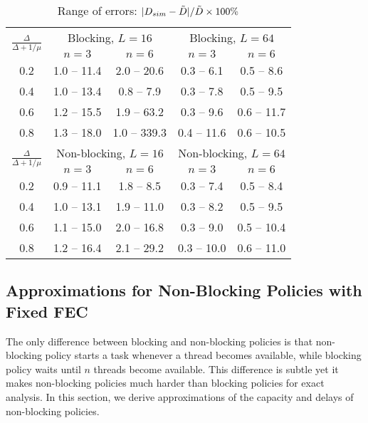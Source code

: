 \documentclass[journal]{IEEEtran}
\begin{document}
\begin{table}[t]
\centering
\begin{tabular}{|c|c|c|c|c|}
\hline
\multirow{2}{*}{$\frac{\Delta}{\Delta + 1/\mu}$} & \multicolumn{2}{c|}{ Blocking, $L = 16$}  & \multicolumn{2}{c|}{ Blocking, $L = 64$}\\
\cline{2-5}
& $n=3$ & $n=6$ & $n=3$  & $n=6$\\
\hline
0.2& 1.0 -- 11.4 & 2.0 -- 20.6 & 0.3 -- 6.1 & 0.5 -- 8.6\\
\hline
0.4& 1.0 -- 13.4 & 0.8 -- 7.9 & 0.3 -- 7.8 & 0.5 -- 9.5\\
\hline
0.6& 1.2 -- 15.5 & 1.9 -- 63.2 & 0.3 -- 9.6 & 0.6 -- 11.7\\
\hline
0.8& 1.3 -- 18.0 & 1.0 -- 339.3 & 0.4 -- 11.6 & 0.6 -- 10.5\\
\hline \hline
\multirow{2}{*}{$\frac{\Delta}{\Delta + 1/\mu}$} & \multicolumn{2}{c|}{ Non-blocking, $L = 16$}  & \multicolumn{2}{c|}{Non-blocking,  $L = 64$}\\
\cline{2-5}
& $n=3$ & $n=6$ & $n=3$  & $n=6$\\
\hline
0.2& 0.9 -- 11.1 & 1.8 -- 8.5 & 0.3 -- 7.4 & 0.5 -- 8.4\\
\hline
0.4& 1.0 -- 13.1 & 1.9 -- 11.0 & 0.3 -- 8.2 & 0.5 -- 9.5\\
\hline
0.6& 1.1 -- 15.0 & 2.0 -- 16.8 & 0.3 -- 9.0 & 0.5 -- 10.4\\
\hline
0.8& 1.2 -- 16.4 & 2.1 -- 29.2 & 0.3 -- 10.0 & 0.6 -- 11.0\\
\hline
\end{tabular}
\caption{Range of errors: $|D_{sim}-\tilde{D}|/\tilde{D} \times 100\%$}
\label{tab:error}
\vspace{-25pt}
\end{table}

\subsection{Approximations for Non-Blocking Policies with Fixed FEC}
The only difference between blocking and non-blocking policies is that non-blocking policy starts a task whenever a thread becomes available, while blocking policy waits until $n$ threads become available. 
This difference is subtle yet it makes non-blocking policies much harder than blocking policies for exact analysis. In this section, we derive approximations of the capacity and delays of non-blocking policies. 
\end{document}
